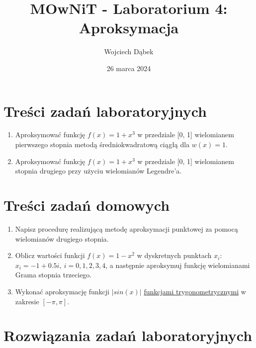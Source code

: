 \documentclass{article}
\title{MOwNiT - Laboratorium 4:\\
Aproksymacja}
\author{Wojciech Dąbek}
\date{26 marca 2024}
\begin{document}
\maketitle

\section{Treści zadań laboratoryjnych}

\begin{enumerate}
    \item Aproksymować funkcję \(f(x) = 1 + x^3\) w przedziale [0, 1] wielomianem pierwszego stopnia metodą średniokwadratową ciągłą dla \(w(x) = 1\).
    \item Aproksymować funkcję \(f(x) = 1 + x^3\) w przedziale [0, 1] wielomianem stopnia drugiego przy użyciu wielomianów Legendre'a.
\end{enumerate}

\section{Treści zadań domowych}

\begin{enumerate}
    \item Napisz procedurę realizującą metodę aproksymacji punktowej za pomocą wielomianów drugiego stopnia.
    \item Oblicz wartości funkcji \(f(x) = 1 - x^2\) w dyskretnych punktach \(x_i:\)\\
    \(x_i = -1 + 0.5i,\ i = 0, 1, 2, 3, 4\), a następnie aproksymuj funkcję wielomianami Grama stopnia trzeciego.
    \item Wykonać aproksymację funkcji \(|sin(x)|\) \href{https://pl.wikipedia.org/wiki/Szereg_Fouriera}{funkcjami trygonometrycznymi} w zakresie \([-\pi, \pi]\).
\end{enumerate}

\section{Rozwiązania zadań laboratoryjnych}
\end{document}
